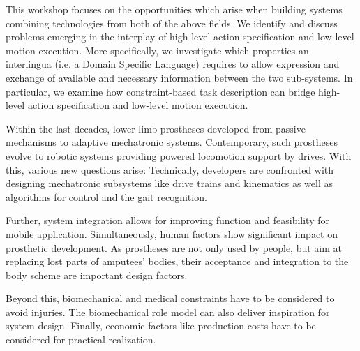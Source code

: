 \begin{spacing}{1.0}
{This workshop focuses on the opportunities which arise when building systems combining technologies from both of the above fields. We identify and discuss problems emerging in the interplay of high-level action specification and low-level motion execution. More specifically, we investigate which properties an interlingua (i.e. a Domain Specific Language) requires to allow expression and exchange of available and necessary information between the two sub-systems. In particular, we examine how constraint-based task description can bridge high-level action specification and low-level motion execution.

}



{
Within the last decades, lower limb prostheses developed from passive mechanisms to adaptive mechatronic systems. Contemporary, such prostheses evolve to robotic systems providing powered locomotion support by drives. With this, various new questions arise: Technically, developers are confronted with designing mechatronic subsystems like drive trains and kinematics as well as algorithms for control and the gait recognition.

Further, system integration allows for improving function and feasibility for mobile application. Simultaneously, human factors show significant impact on prosthetic development. As prostheses are not only used by people, but aim at replacing lost parts of amputees’ bodies, their acceptance and integration to the body scheme are important design factors.

Beyond this, biomechanical and medical constraints have to be considered to avoid injuries. The biomechanical role model can also deliver inspiration for system design. Finally, economic factors like production costs have to be considered for practical realization.
}




\end{spacing}

